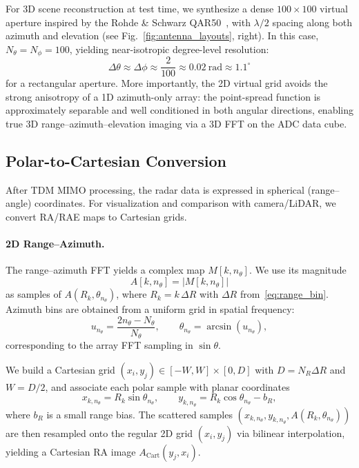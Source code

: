 For 3D scene reconstruction at test time, we synthesize a dense $100 \times 100$ virtual aperture inspired by the Rohde \& Schwarz QAR50~\cite{rs_qar}, with
$\lambda/2$ spacing along both azimuth and elevation (see
Fig.~\ref{fig:antenna_layouts}, right). In this case,
$N_\theta = N_\phi = 100$, yielding near-isotropic
degree-level resolution:
\begin{equation}
    \Delta \theta \approx 
    \Delta \phi \approx
    \frac{2}{100} \approx 0.02~\text{rad} \approx 1.1^\circ
\end{equation}
for a rectangular aperture. More importantly, the 2D virtual grid avoids the strong
anisotropy of a 1D azimuth-only array: the point-spread function is
approximately separable and well conditioned in both angular
directions, enabling true 3D range–azimuth–elevation imaging via a
3D FFT on the ADC data cube.



\subsection{Polar-to-Cartesian Conversion}
\label{sec:supp_polar_to_cartesian}

After TDM MIMO processing, the radar data is expressed in spherical (range--angle) coordinates. For visualization and comparison with camera/LiDAR, we convert RA/RAE maps to Cartesian grids.

\paragraph{2D Range–Azimuth.}
The range–azimuth FFT yields a complex map $M[k,n_\theta]$. We use its magnitude
\[
    A[k,n_\theta] = |M[k,n_\theta]|
\]
as samples of $A(R_k,\theta_{n_\theta})$, where $R_k = k\,\Delta R$ with $\Delta R$ from~\eqref{eq:range_bin}. Azimuth bins are obtained from a uniform grid in spatial frequency:
\[
    u_{n_\theta} = \frac{2n_\theta - N_\theta}{N_\theta}, 
    \qquad
    \theta_{n_\theta} = \arcsin(u_{n_\theta}),
\]
corresponding to the array FFT sampling in $\sin\theta$.

We build a Cartesian grid $(x_i,y_j) \in [-W,W]\times[0,D]$ with $D = N_R \Delta R$ and $W = D/2$, and associate each polar sample with planar coordinates
\[
    x_{k,n_\theta} = R_k \sin\theta_{n_\theta}, \qquad
    y_{k,n_\theta} = R_k \cos\theta_{n_\theta} - b_R,
\]
where $b_R$ is a small range bias. The scattered samples $(x_{k,n_\theta},y_{k,n_\theta},A(R_k,\theta_{n_\theta}))$ are then resampled onto the regular 2D grid $(x_i,y_j)$ via bilinear interpolation, yielding a Cartesian RA image $A_\text{Cart}(y_j,x_i)$.

